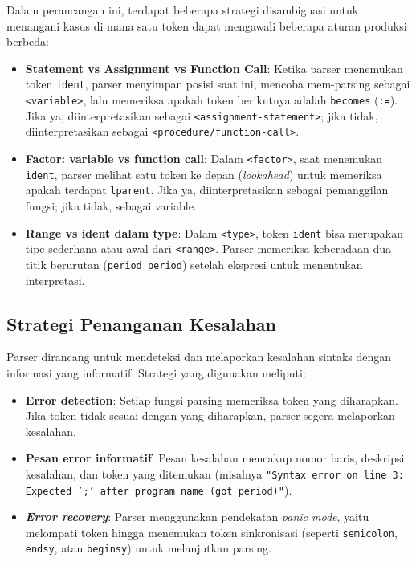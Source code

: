 \documentclass[12pt,a4paper]{article}
\begin{document}
Dalam perancangan ini, terdapat beberapa strategi disambiguasi untuk menangani kasus di mana satu token dapat mengawali beberapa aturan produksi berbeda:
\begin{itemize}
    \item \textbf{Statement vs Assignment vs Function Call}: Ketika parser menemukan token \texttt{ident}, parser menyimpan posisi saat ini, mencoba mem-parsing sebagai \texttt{<variable>}, lalu memeriksa apakah token berikutnya adalah \texttt{becomes} (\texttt{:=}). Jika ya, diinterpretasikan sebagai \texttt{<assignment-statement>}; jika tidak, diinterpretasikan sebagai \texttt{<procedure/function-call>}.
    \item \textbf{Factor: variable vs function call}: Dalam \texttt{<factor>}, saat menemukan \texttt{ident}, parser melihat satu token ke depan (\textit{lookahead}) untuk memeriksa apakah terdapat \texttt{lparent}. Jika ya, diinterpretasikan sebagai pemanggilan fungsi; jika tidak, sebagai variable.
    \item \textbf{Range vs ident dalam type}: Dalam \texttt{<type>}, token \texttt{ident} bisa merupakan tipe sederhana atau awal dari \texttt{<range>}. Parser memeriksa keberadaan dua titik berurutan (\texttt{period period}) setelah ekspresi untuk menentukan interpretasi.
\end{itemize}

\subsection{Strategi Penanganan Kesalahan}

Parser dirancang untuk mendeteksi dan melaporkan kesalahan sintaks dengan informasi yang informatif. Strategi yang digunakan meliputi:
\begin{itemize}
    \item \textbf{Error detection}: Setiap fungsi parsing memeriksa token yang diharapkan. Jika token tidak sesuai dengan yang diharapkan, parser segera melaporkan kesalahan.
    \item \textbf{Pesan error informatif}: Pesan kesalahan mencakup nomor baris, deskripsi kesalahan, dan token yang ditemukan (misalnya \texttt{"Syntax error on line 3: Expected ';' after program name (got period)"}).
    \item \textbf{\textit{Error recovery}}: Parser menggunakan pendekatan \textit{panic mode}, yaitu melompati token hingga menemukan token sinkronisasi (seperti \texttt{semicolon}, \texttt{endsy}, atau \texttt{beginsy}) untuk melanjutkan parsing.
\end{itemize}
\end{document}
